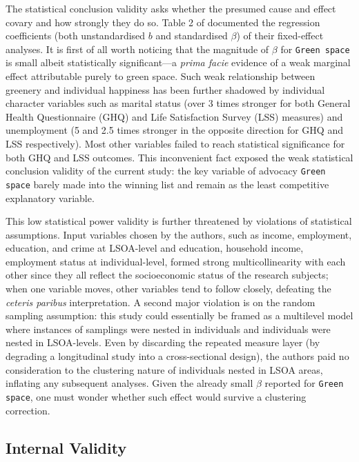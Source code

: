 The statistical conclusion validity asks whether the presumed cause and effect covary and how strongly they do so. Table 2 of \textcite[][p. 925]{white:2013} documented the regression coefficients (both unstandardised $b$ and standardised $\beta$) of their fixed-effect analyses. It is first of all worth noticing that the magnitude of $\beta$ for \texttt{Green space} is small albeit statistically significant---a \emph{prima facie} evidence of a weak marginal effect attributable purely to green space. Such weak relationship between greenery and individual happiness has been further shadowed by individual character variables such as marital status (over 3 times stronger for both General Health Questionnaire (GHQ) and Life Satisfaction Survey (LSS) measures) and unemployment (5 and 2.5 times stronger in the opposite direction for GHQ and LSS respectively). Most other variables failed to reach statistical significance for both GHQ and LSS outcomes. This inconvenient fact exposed the weak statistical conclusion validity of the current study: the key variable of advocacy \texttt{Green space} barely made into the winning list and remain as the least competitive explanatory variable.

This low statistical power validity is further threatened by violations of statistical assumptions. Input variables chosen by the authors, such as income, employment, education, and crime at LSOA-level and education, household income, employment status at individual-level, formed strong multicollinearity with each other since they all reflect the socioeconomic status of the research subjects; when one variable moves, other variables tend to follow closely, defeating the \emph{ceteris paribus} interpretation. A second major violation is on the random sampling assumption: this study could essentially be framed as a multilevel model where instances of samplings were nested in individuals and individuals were nested in LSOA-levels. Even by discarding the repeated measure layer (by degrading a longitudinal study into a cross-sectional design), the authors paid no consideration to the clustering nature of individuals nested in LSOA areas, inflating any subsequent analyses. Given the already small $\beta$ reported for \texttt{Green space}, one must wonder whether such effect would survive a clustering correction.

\subsection{Internal Validity}

